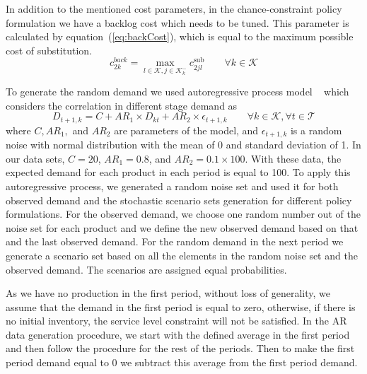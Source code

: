 \documentclass[11pt]{article}
\newcommand{\ti}{t} %
\newcommand{\TI}{\mathcal{T}}
\newcommand{\ka}{k} %
\newcommand{\KA}{\mathcal{K}}
\newcommand{\jey}{j} %
\newcommand{\Psub}{\mathcal{K}^-_k}
\begin{document}
In addition to the mentioned cost parameters, in the chance-constraint policy formulation we have a backlog cost which needs to be tuned. This parameter is calculated by equation~(\ref{eq:backCost}), which is equal to the maximum possible cost of substitution.
\begin{equation}
c^{back}_{ 2 \ka} = \max_{l \in \KA ,\jey \in \Psub }c^{\text{sub}}_{2 \jey l  }  \qquad \forall \ka  \in \KA       \label{eq:backCost}
\end{equation} 


To generate the random demand we used autoregressive process model ~\cite{jiang2017production} which considers the correlation in different stage demand as  
\begin{equation}
D_{ \ti+1,\ka} = C + AR_1 \times D_{ \ka \ti} + AR_2 \times \epsilon_{\ti+1,\ka }  \qquad \forall \ka  \in \KA , \forall \ti \in \TI       \label{eq:AR1}
\end{equation}
where $C, AR_1,$ and $AR_2$ are parameters of the model, and $\epsilon_{ \ti+1,\ka}$ is a random noise with normal distribution with the mean of 0 and standard deviation of 1. 
In our data sets, $C = 20$, $AR_1 = 0.8$, and $AR_2 = 0.1 \times 100$. With these data, the expected demand for each product in each period is equal to 100. To apply this autoregressive process, we generated a random noise set and used it for both observed demand and the stochastic scenario sets generation for different policy formulations. For the observed demand, we choose one random number out of the noise set for each product and we define the new observed demand based on that and the last observed demand. For the random demand in the next period we generate a scenario set based on all the elements in the random noise set and the observed demand.  The scenarios are assigned equal probabilities.

{As we have no production in the first period, without loss of generality, we assume that the demand in the first period is equal to zero, otherwise, if there is no initial inventory, the service level constraint will not be satisfied. In the AR data generation procedure, we start with the defined average in the first period and then follow the procedure for the rest of the periods. Then to make the first period demand equal to 0 we subtract this average from the first period demand.} 
\end{document}
